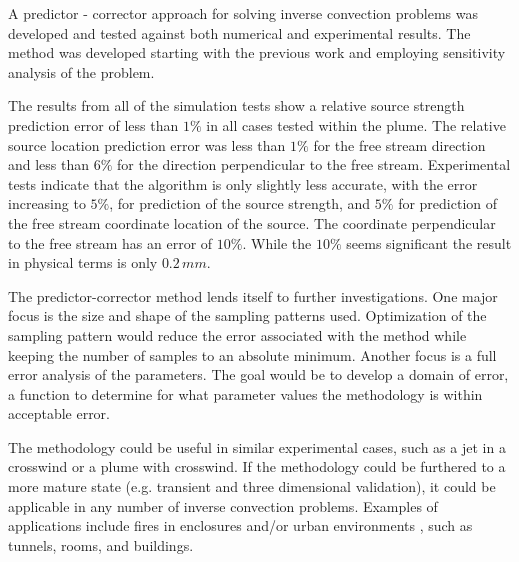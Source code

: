 \documentclass[preprint,12pt]{elsarticle}
\begin{document}
A predictor - corrector approach for solving inverse convection problems was developed and tested against both numerical and experimental results.  The method was developed starting with the previous work \cite{knight,rossmann} and employing sensitivity analysis of the problem.  

The results from all of the simulation tests show a relative source strength prediction error of less than $1\%$ in all cases tested within the plume.  The relative source location prediction error was less than $1\%$ for the free stream direction and less than $6\%$ for the direction perpendicular to the free stream.  Experimental tests indicate that the algorithm is only slightly less accurate, with the error increasing to $5\%$, for prediction of the source strength, and $5\%$ for prediction of the free stream coordinate location of the source.  The coordinate perpendicular to the free stream has an error of $10\%$.  While the $10\%$ seems significant the result in physical terms is only $0.2 \, mm$.

The predictor-corrector method lends itself to further investigations.  One major focus is the size and shape of the sampling patterns used.  Optimization of the sampling pattern would reduce the error associated with the method while keeping the number of samples to an absolute minimum.  Another focus is a full error analysis of the parameters.  The goal would be to develop a domain of error, a function to determine for what parameter values the methodology is within acceptable error.

The methodology could be useful in similar experimental cases, such as a jet in a crosswind or a plume with  crosswind.  If the methodology could be furthered to a more mature state (e.g. transient and three dimensional validation), it could be applicable in any number of inverse convection problems.  Examples of applications include fires in enclosures and/or urban environments\cite{hu}	, such as tunnels\cite{blanchard}, rooms, and buildings.

\appendix

{}

\end{document}
